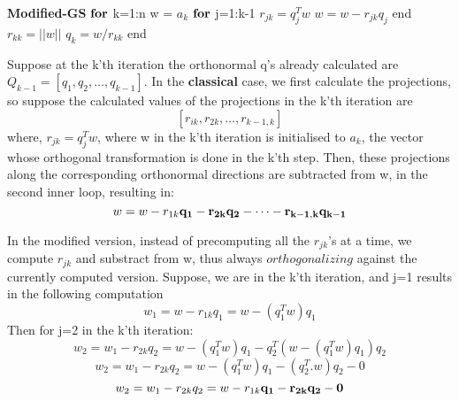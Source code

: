 \documentclass{article}
\begin{document}
 \textbf {Modified-GS} \newline
 \hspace*{0.5cm} $\bf for$ k=1:n \newline
 \hspace*{1.0cm} w = $a_k$ \newline
 \hspace*{1.0cm} $\bf for$ j=1:k-1 \newline
 \hspace*{1.5cm} $r_{jk} = q_{j}^Tw$ \newline
 \hspace*{1.5cm} $w = w - r_{jk}q_{j}$ \newline
 \hspace*{1.0cm} end \newline
 \hspace*{1.0cm} $r_{kk} = ||w||$ \newline
 \hspace*{1.0cm} $q_{k} = w/r_{kk}$ \newline
 \hspace*{0.5cm} end \newline

 Suppose at the k'th iteration the orthonormal q's already calculated are $Q_{k-1} = [q_1, q_2, \dots, q_{k-1}]$. In the \textbf {classical} case, we first calculate the projections, so suppose the calculated values of the projections in the k'th iteration are \newline
 \[[r_{ik}, r_{2k}, \dots, r_{k-1,k}]\]
 where, $r_{jk} = q_{j}^Tw$,  where w in the k'th iteration is initialised to $a_{k}$, the vector whose orthogonal transformation is done in the k'th step. Then, these projections along the corresponding orthonormal directions are subtracted from w, in the second inner loop, resulting in: \newline
 \begin{equation}
  w = w - r_{1k}\bf q_1 - r_{2k}\bf q_2 - \dots - r_{k-1,k}\bf q_{k-1}
 \end{equation}

 In the modified version, instead of precomputing all the $r_{jk}$'s at a time, we compute $r_{jk}$ and substract from w, thus always $orthogonalizing$ against the currently computed version. Suppose, we are in the k'th iteration, and j=1 results in the following computation
 \[ w_{1} = w - r_{1k}q_1 = w - (q_{1}^Tw)q_1 \]
 Then for j=2 in the k'th iteration: \newline
 \[ w_{2} = w_1 - r_{2k}q_2 =  w - (q_{1}^Tw)q_1 -   q_{2}^T(w - (q_{1}^Tw)q_1)q_2   \]
 \[ w_{2} = w_1 - r_{2k}q_2 =  w - (q_{1}^Tw)q_1 -   (q_{2}^T.w)q_2 - 0   \]
 \[ w_{2} = w_1 - r_{2k}q_2 =  w - r_{1k}\bf q_1 -   r_{2k}\bf q_2 - 0   \]
\end{document}
